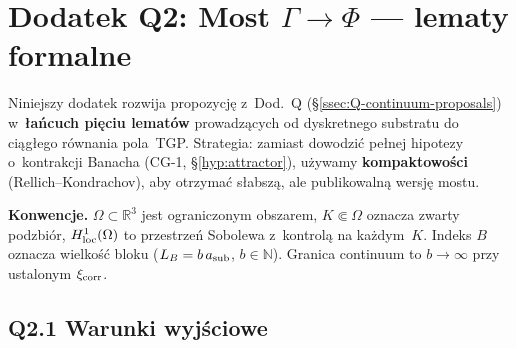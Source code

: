 %
%
%

\section*{Dodatek Q2: Most $\Gamma \to \Phi$ --- lematy formalne}
\label{app:bridge_lemmata}

\noindent
Niniejszy dodatek rozwija propozycj\k{e} z~Dod.~Q (\S\ref{ssec:Q-continuum-proposals})
w~\textbf{{\l}a\'ncuch pi\k{e}ciu lemat\'ow} prowadz\k{a}cych od dyskretnego
substratu do ci\k{a}g\l{}ego r\'ownania pola~TGP.
Strategia: zamiast dowodzi\'c pe\l{}nej hipotezy o~kontrakcji Banacha
(CG-1, \S\ref{hyp:attractor}), u\.zywamy \textbf{kompaktowo\'sci}
(Rellich--Kondrachov), aby otrzyma\'c s\l{}absz\k{a},
ale publikowaln\k{a} wersj\k{e} mostu.

\medskip\noindent
\textbf{Konwencje.}
$\Omega \subset \mathbb{R}^3$ jest ograniczonym obszarem,
$K \Subset \Omega$ oznacza zwarty podzbi\'or,
$H^1_{\rm loc}(\Omega)$ to przestrze\'n Sobolewa z~kontrol\k{a} na ka\.zdym~$K$.
Indeks $B$ oznacza wielko\'s\'c bloku ($L_B = b\,a_{\rm sub}$, $b \in \mathbb{N}$).
Granica continuum to $b \to \infty$ przy ustalonym $\xi_{\rm corr}$.

\subsection*{Q2.1 Warunki wyj\'sciowe}
\label{ssec:Q2-assumptions}

